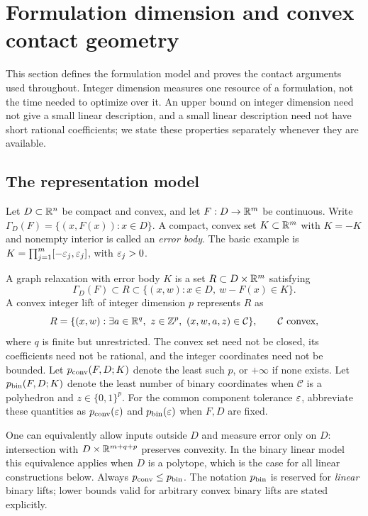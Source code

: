 \section{Formulation dimension and convex contact geometry}\label{sec:foundations}

This section defines the formulation model and proves the contact
arguments used throughout. Integer dimension measures one resource of a
formulation, not the time needed to optimize over it. An upper bound on
integer dimension need not give a small linear description, and a small
linear description need not have short rational coefficients; we state
these properties separately whenever they are available.

\subsection{The representation model}

Let $D\subset\mathbb R^n$ be compact and convex, and let $F:D\to\mathbb R^m$ be
continuous. Write $\Gamma_D(F)=\{(x,F(x)):x\in D\}$. A compact, convex
set $K\subset\mathbb R^m$ with $K=-K$ and nonempty interior is called
an \emph{error body}. The basic example is
$K=\prod_{j=1}^m[-\varepsilon_j,\varepsilon_j]$, with $\varepsilon_j>0$.

\begin{definition}\label{def:dimension}
A graph relaxation with error body $K$ is a set $R\subset D\times\mathbb R^m$
satisfying
\[
 \Gamma_D(F)\subset R\subset
 \{(x,w):x\in D,\ w-F(x)\in K\}.
\]
A convex integer lift of integer dimension $p$ represents $R$ as
\begin{equation}\label{eq:convex-lift}
 R=\{(x,w):\exists a\in\mathbb R^q,\ z\in\mathbb Z^p,
                  \ (x,w,a,z)\in\mathcal C\},
 \qquad \mathcal C\text{ convex},
\end{equation}
where $q$ is finite but unrestricted. The convex set need not be closed,
its coefficients need not be rational, and the integer coordinates need
not be bounded. Let $p_{\mathrm{conv}}(F,D;K)$ denote the least such $p$, or $+\infty$
if none exists. Let $p_{\mathrm{bin}}(F,D;K)$ denote the least number of binary
coordinates when $\mathcal C$ is a polyhedron and $z\in\{0,1\}^p$.
For the common component tolerance $\varepsilon$, abbreviate these quantities
as $p_{\mathrm{conv}}(\varepsilon)$ and $p_{\mathrm{bin}}(\varepsilon)$ when $F,D$ are fixed.
\end{definition}

One can equivalently allow inputs outside $D$ and measure error only on
$D$: intersection with $D\times\mathbb R^{m+q+p}$ preserves convexity. In the
binary linear model this equivalence applies when $D$ is a polytope,
which is the case for all linear constructions below. Always
$p_{\mathrm{conv}}\le p_{\mathrm{bin}}$. The notation $p_{\mathrm{bin}}$ is reserved for \emph{linear}
binary lifts; lower bounds valid for arbitrary convex binary lifts are
stated explicitly.

